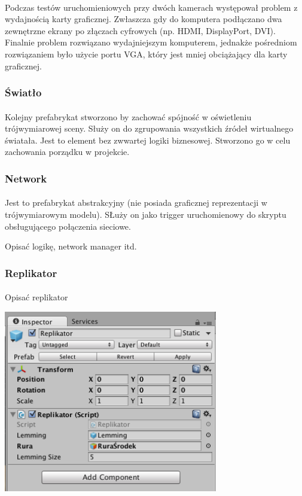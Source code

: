 \paragraph{}
Podczas testów uruchomieniowych przy dwóch kamerach występował problem z wydajnością karty graficznej. Zwłaszcza gdy do komputera podłączano dwa zewnętrzne ekrany po złączach cyfrowych (np. HDMI, DisplayPort, DVI). Finalnie problem rozwiązano wydajniejszym komputerem, jednakże pośredniom rozwiązaniem było użycie portu VGA, który jest mniej obciążający dla karty graficznej.

\subsubsection{Światło}
\paragraph{}
Kolejny prefabrykat stworzono by zachować spójność w oświetleniu trójwymiarowej sceny. Służy on do zgrupowania wszystkich źródeł wirtualnego światała. Jest to element bez zwwartej logiki biznesowej. Stworzono go w celu zachowania porządku w projekcie.

\subsubsection{Network}
\paragraph{}
Jest to prefabrykat abstrakcyjny (nie posiada graficznej reprezentacji w trójwymiarowym modelu). SŁuży on jako trigger uruchomienowy do skryptu obsługującego połączenia sieciowe.

{\color{red}Opisać logikę, network manager itd}.

\subsubsection{Replikator}
\paragraph{}
{\color{red}Opisać replikator}
\begin{center}
\includegraphics[width=0.7\textwidth]{images/replikator.png}
\end{center}

